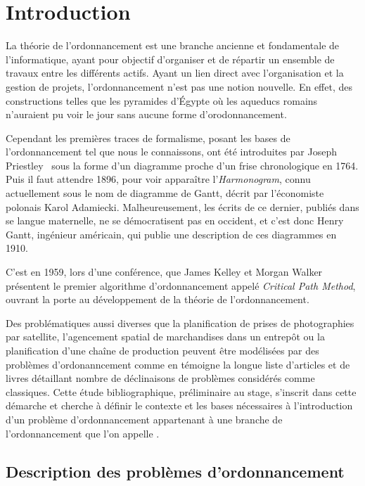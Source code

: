 \documentclass[a4paper,11pt]{report}
\begin{document}


\chapter{Introduction}

La théorie de l'ordonnancement est une branche ancienne et fondamentale de l'informatique, ayant
pour objectif d'organiser et de répartir un ensemble de travaux entre les différents actifs. Ayant
un lien direct avec l'organisation et la gestion de projets, l'ordonnancement n'est pas une notion
nouvelle. En effet, des constructions telles que les pyramides d'Égypte où les aqueducs romains
n'auraient pu voir le jour sans aucune forme d'orodonnancement.

Cependant les premières traces de formalisme, posant les bases de l'ordonnancement tel que nous
le connaissons, ont été introduites par Joseph Priestley~\cite{joseph_priestley_description_1764}
sous la forme d'un diagramme proche d'un frise chronologique en 1764. Puis il faut attendre 1896,
pour voir apparaître l'\emph{Harmonogram}, connu actuellement sous le nom de diagramme de Gantt,
décrit par l'économiste polonais Karol Adamiecki. Malheureusement, les écrits de ce dernier, publiés
dans se langue maternelle, ne se démocratisent pas en occident, et c'est donc Henry Gantt, ingénieur
américain, qui publie une description de ces diagrammes en 1910.

C'est en 1959, lors d'une conférence, que James Kelley et Morgan Walker~\cite{kelley1959critical}
présentent le premier algorithme d'ordonnancement appelé \emph{Critical Path Method}, ouvrant la
porte au développement de la théorie de l'ordonnancement.

Des problématiques aussi diverses que la planification de prises de photographies par satellite,
l'agencement spatial de marchandises dans un entrepôt ou la planification d'une chaîne de production
peuvent être modélisées par des problèmes d'ordonanncement comme en témoigne la longue liste
d'articles et de livres détaillant nombre de déclinaisons de problèmes
considérés comme classiques. Cette étude bibliographique, préliminaire au stage, s'inscrit dans cette
démarche et cherche à définir le contexte et les bases nécessaires à l'introduction
d'un problème d'ordonnancement appartenant à une branche de l'ordonnancement que l'on appelle \isched{}.

\section{Description des problèmes d'ordonnancement}
\end{document}
